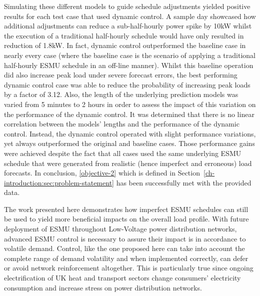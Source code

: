 Simulating these different models to guide schedule adjustments yielded positive results for each test case that used dynamic control.
A sample day showcased how additional adjustments can reduce a sub-half-hourly power spike by 10kW whilst the execution of a traditional half-hourly schedule would have only resulted in reduction of 1.8kW.
In fact, dynamic control outperformed the baseline case in nearly every case (where the baseline case is the scenario of applying a traditional half-hourly ESMU schedule in an off-line manner).
Whilst this baseline operation did also increase peak load under severe forecast errors, the best performing dynamic control case was able to reduce the probability of increasing peak loads by a factor of 3.12.
Also, the length of the underlying prediction models was varied from 5 minutes to 2 hours in order to assess the impact of this variation on the performance of the dynamic control.
It was determined that there is no linear correlation between the models' lengths and the performance of the dynamic control.
Instead, the dynamic control operated with slight performance variations, yet always outperformed the original and baseline cases.
Those performance gains were achieved despite the fact that all cases used the same underlying ESMU schedule that were generated from realistic (hence imperfect and erroneous) load forecasts.
In conclusion, \ref{objective-2} which is defined in Section~\ref{ch-introduction:sec:problem-statement} has been successfully met with the provided data.

The work presented here demonstrates how imperfect ESMU schedules can still be used to yield more beneficial impacts on the overall load profile.
With future deployment of ESMU throughout Low-Voltage power distribution networks, advanced ESMU control is necessary to assure their impact is in accordance to volatile demand.
Control, like the one proposed here can take into account the complete range of demand volatility and when implemented correctly, can defer or avoid network reinforcement altogether.
This is particularly true since ongoing electrification of UK heat and transport sectors change consumers' electricity consumption and increase stress on power distribution networks.
